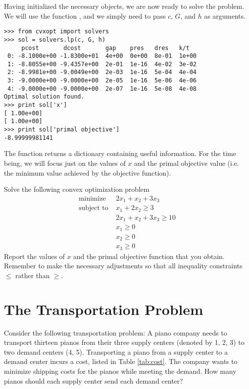 Having initialized the necessary objects, we are now ready to solve the problem.
We will use the function , and we simply need to pass $c$, $G$, and $h$ as arguments.
\begin{lstlisting}
>>> from cvxopt import solvers
>>> sol = solvers.lp(c, G, h)
     pcost       dcost       gap    pres   dres   k/t
 0: -8.1000e+00 -1.8300e+01  4e+00  0e+00  8e-01  1e+00
 1: -8.8055e+00 -9.4357e+00  2e-01  1e-16  4e-02  3e-02
 2: -8.9981e+00 -9.0049e+00  2e-03  1e-16  5e-04  4e-04
 3: -9.0000e+00 -9.0000e+00  2e-05  1e-16  5e-06  4e-06
 4: -9.0000e+00 -9.0000e+00  2e-07  1e-16  5e-08  4e-08
Optimal solution found.
>>> print sol['x']
[ 1.00e+00]
[ 1.00e+00]
>>> print sol['primal objective']
-8.99999981141
\end{lstlisting}
The function  returns a dictionary containing useful information.
For the time being, we will focus just on the values of $x$ and the primal objective value (i.e. the minimum value achieved by
the objective function).
\begin{problem}
Solve the following convex optimization problem
\begin{align*}
\text{minimize } &2x_1+x_2+3x_3 \\
\text{subject to } &x_1+2x_2 \geq 3 \\
	        &2x_1+x_2+3x_3 \geq 10 \\
		&x_1 \geq 0 \\
		&x_2 \geq 0 \\
		&x_3 \geq 0
\end{align*}
Report the values of $x$ and the primal objective function that you obtain.
Remember to make the necessary adjustments so that all inequality constraints $\leq$ rather than $\geq$.
\end{problem}

\section*{The Transportation Problem}

Consider the following transportation problem:
A piano company needs to transport thirteen pianos from their three  supply centers (denoted by 1, 2, 3) to two demand centers (4, 5).
Transporting a piano from a supply center to a demand center incurs a cost, listed in Table \ref{tab:cost}.
The company wants to minimize shipping costs for the pianos while meeting the demand.
How many pianos should each supply center send each demand center?

